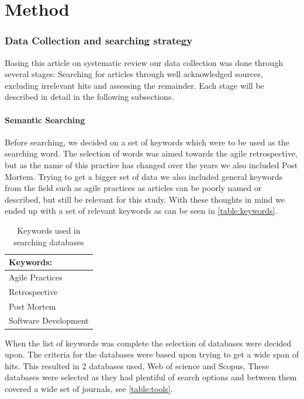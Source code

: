 \documentclass[12pt]{article}
\begin{document}
\clearpage

\part{Method}

\section{Data Collection and searching strategy}
Basing this article on systematic review our data collection was done through several stages: Searching for articles through well acknowledged sources, excluding irrelevant hits and assessing the remainder. Each stage will be described in detail in the following subsections.

\subsection{Semantic Searching}
Before searching, we decided on a set of keywords which were to be used as the searching word. The selection of words was aimed towards the agile retrospective, but as the name of this practice has changed over the years we also included Post Mortem. Trying to get a bigger set of data we also included general keywords from the field such as agile practices as articles can be poorly named or described, but still be relevant for this study. With these thoughts in mind we ended up with a set of relevant keywords as can be seen in \autoref{table:keywords}.

\begin{table}[!h]
	\begin{center}
		\caption{Keywords used in searching databases}
		\label{table:keywords}
		\begin{tabular}{ l }
			Keywords: \\ \hline
			Agile Practices \\
			Retrospective \\
			Post Mortem \\
			Software Development \\
		\end{tabular}
	\end{center}
\end{table}

When the list of keywords was complete the selection of databases were decided upon. The criteria for the databases were based upon trying to get a wide span of hits. This resulted in 2 databases used, Web of science and Scopus, These databases were selected as they had plentiful of search options and between them covered a wide set of journals, see \autoref{table:tools}. 
\end{document}
